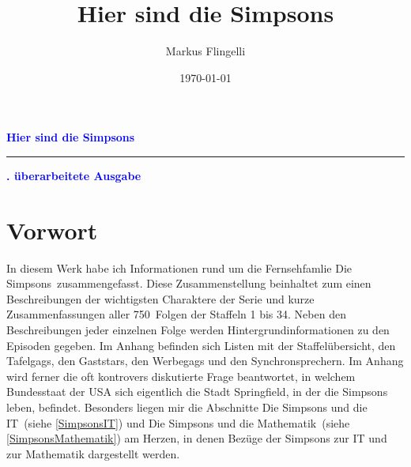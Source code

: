 \documentclass[pagesize,twoside,german]{scrbook}
\author{Markus Flingelli}
\date{\today}
\title{Hier sind die Simpsons}
\newcommand{\staffelAnzahl}{34}
\newcommand{\episodenAnzahl}{750}
\begin{document}
\setcounter{page}{1}

\def\datengerman{\def\today{\ifnum\day<10 0\fi\number\day.\ifnum\month<10 0\fi\number\month.\number\year}}

{}


\HTMLOutput{}
{
}

  
\HTMLOutput{
\maketitle
}
{
\vspace*{3ex}
\pagecolor{titleColor}\afterpage{\nopagecolor}
\vspace*{8cm}
\begin{flushleft}
  \Huge\textcolor{blue}{\textbf{\sffamily Hier sind die Simpsons}}\\
  \textcolor{blue}{\rule{\linewidth}{4pt}}
  \vspace{2ex}
  \huge\textcolor{blue}{\textbf{. überarbeitete Ausgabe}}
\end{flushleft}

\newpage
}

{}

\section*{Vorwort}
In diesem Werk habe ich Informationen rund um die Fernsehfamlie \glqq Die Simpsons\grqq\ zusammengefasst. Diese Zusammenstellung beinhaltet zum einen Beschreibungen der wichtigsten Charaktere der Serie und kurze Zusammenfassungen aller \episodenAnzahl\ Folgen der Staffeln 1 bis \staffelAnzahl . Neben den Beschreibungen jeder einzelnen Folge werden Hintergrundinformationen zu den Episoden gegeben. Im Anhang befinden sich Listen mit der Staffelübersicht, den Tafelgags, den Gaststars, den Werbegags und den Synchronsprechern. Im Anhang wird ferner die oft kontrovers diskutierte Frage beantwortet, in welchem Bundesstaat der USA sich eigentlich die Stadt Springfield, in der die Simpsons leben, befindet. Besonders liegen mir die Abschnitte \glqq Die Simpsons und die IT\grqq\ (siehe \ref{SimpsonsIT}) und \glqq Die Simpsons und die Mathematik\grqq\ (siehe \ref{SimpsonsMathematik}) am Herzen, in denen Bezüge der Simpsons zur IT und zur Mathematik dargestellt werden.
\end{document}
